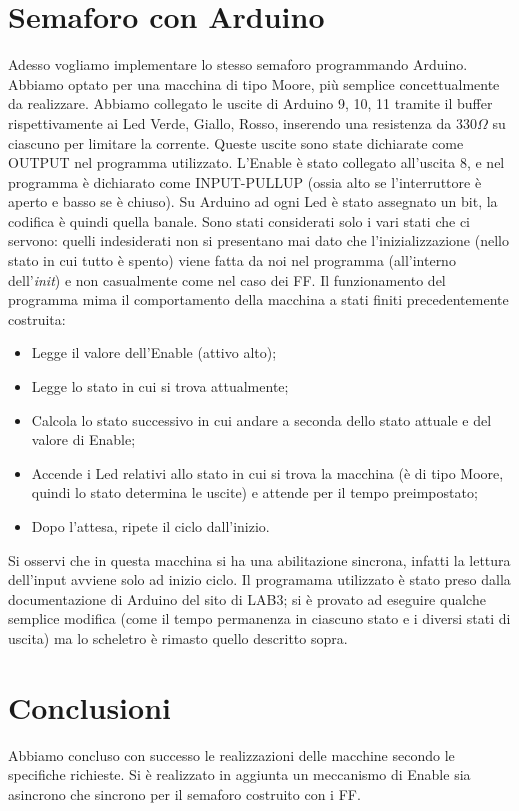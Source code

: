 \documentclass[10pt,a4paper]{article}
\begin{document}
\section{Semaforo con Arduino}
Adesso vogliamo implementare lo stesso semaforo programmando Arduino. Abbiamo optato per una macchina di tipo Moore, più semplice concettualmente da realizzare.
Abbiamo collegato le uscite di Arduino 9, 10, 11 tramite il buffer rispettivamente ai Led Verde, Giallo, Rosso, inserendo una resistenza da $330\Omega$ su ciascuno per limitare la corrente.
Queste uscite sono state dichiarate come OUTPUT nel programma utilizzato.
L'Enable è stato collegato all'uscita 8, e nel programma è dichiarato come INPUT-PULLUP (ossia alto se l'interruttore è aperto e basso se è chiuso).
Su Arduino ad ogni Led è stato assegnato un bit, la codifica è quindi quella banale. Sono stati considerati solo i vari stati che ci servono: quelli indesiderati non si presentano mai dato che l'inizializzazione (nello stato in cui tutto è spento) viene fatta da noi nel programma (all'interno dell'\emph{init}) e non casualmente come nel caso dei FF.
Il funzionamento del programma mima il comportamento della macchina a stati finiti precedentemente costruita:
\begin{itemize}
\item Legge il valore dell'Enable (attivo alto);
\item Legge lo stato in cui si trova attualmente;
\item Calcola lo stato successivo in cui andare a seconda dello stato attuale e del valore di Enable;
\item Accende i Led relativi allo stato in cui si trova la macchina (è di tipo Moore, quindi lo stato determina le uscite) e attende per il tempo preimpostato;
\item Dopo l'attesa, ripete il ciclo dall'inizio.
\end{itemize}
Si osservi che in questa macchina si ha una abilitazione sincrona, infatti la lettura dell'input avviene solo ad inizio ciclo.
Il programama utilizzato è stato preso dalla documentazione di Arduino del sito di LAB3; si è provato ad eseguire qualche semplice modifica (come il tempo permanenza in ciascuno stato e i diversi stati di uscita) ma lo scheletro è rimasto quello descritto sopra.
\section{Conclusioni}
Abbiamo concluso con successo le realizzazioni delle macchine secondo le specifiche richieste. Si è realizzato in aggiunta un meccanismo di Enable sia asincrono che sincrono per il semaforo costruito con i FF.
\end{document}
